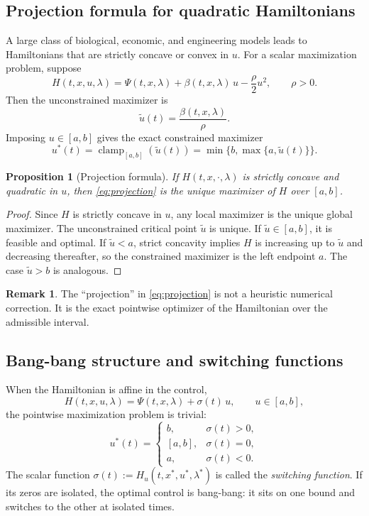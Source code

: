 \documentclass[11pt]{article}
\newtheorem{proposition}{Proposition}
\theoremstyle{definition}
\newtheorem{remark}{Remark}
\newcommand{\clamp}{\operatorname{clamp}}
\begin{document}
\subsection{Projection formula for quadratic Hamiltonians}

A large class of biological, economic, and engineering models leads to Hamiltonians that are strictly concave or convex in $u$. For a scalar maximization problem, suppose
\[
H(t,x,u,\lambda)
=
\Psi(t,x,\lambda) + \beta(t,x,\lambda)\,u - \frac{\rho}{2}u^2,
\qquad \rho>0.
\]
Then the unconstrained maximizer is
\[
\tilde u(t)=\frac{\beta(t,x,\lambda)}{\rho}.
\]
Imposing $u\in[a,b]$ gives the exact constrained maximizer
\begin{equation}
\label{eq:projection}
u^*(t)
=
\clamp_{[a,b]}\!\left(\tilde u(t)\right)
=
\min\{b,\max\{a,\tilde u(t)\}\}.
\end{equation}

\begin{proposition}[Projection formula]
If $H(t,x,\cdot,\lambda)$ is strictly concave and quadratic in $u$, then \eqref{eq:projection} is the unique maximizer of $H$ over $[a,b]$.
\end{proposition}

\begin{proof}
Since $H$ is strictly concave in $u$, any local maximizer is the unique global maximizer. The unconstrained critical point $\tilde u$ is unique. If $\tilde u\in[a,b]$, it is feasible and optimal. If $\tilde u<a$, strict concavity implies $H$ is increasing up to $\tilde u$ and decreasing thereafter, so the constrained maximizer is the left endpoint $a$. The case $\tilde u>b$ is analogous.
\end{proof}

\begin{remark}
The ``projection'' in \eqref{eq:projection} is not a heuristic numerical correction. It is the exact pointwise optimizer of the Hamiltonian over the admissible interval.
\end{remark}

\subsection{Bang-bang structure and switching functions}

When the Hamiltonian is affine in the control,
\[
H(t,x,u,\lambda)
=
\Psi(t,x,\lambda) + \sigma(t)\,u,
\qquad u\in[a,b],
\]
the pointwise maximization problem is trivial:
\begin{equation}
\label{eq:bang-bang}
u^*(t)=
\begin{cases}
b, & \sigma(t)>0,\\
[a,b], & \sigma(t)=0,\\
a, & \sigma(t)<0.
\end{cases}
\end{equation}
The scalar function $\sigma(t):=H_u(t,x^*,u^*,\lambda^*)$ is called the \emph{switching function}. If its zeros are isolated, the optimal control is bang-bang: it sits on one bound and switches to the other at isolated times.
\end{document}
